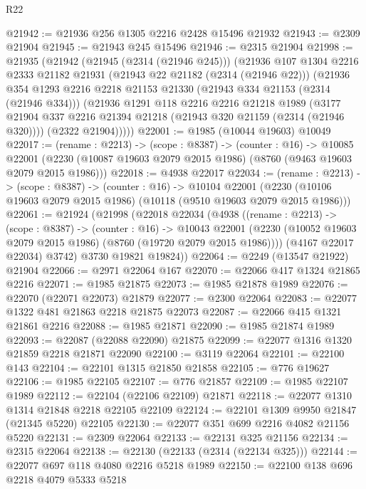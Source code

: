 \begin{lexlean}{R22}
\begin{coremodule}
@21942 := @21936 @256 @1305 @2216 @2428 @15496 @21932
@21943 := @2309 @21904
@21945 := @21943 @245 @15496
@21946 := @2315 @21904
@21998 := @21935
    (@21942
      (@21945 (@2314 (@21946 @245)))
      (@21936
        @107
        @1304
        @2216
        @2333
        @21182
        @21931
        (@21943 @22 @21182 (@2314 (@21946 @22)))
        (@21936
          @354
          @1293
          @2216
          @2218
          @21153
          @21330
          (@21943 @334 @21153 (@2314 (@21946 @334)))
          (@21936
            @1291
            @118
            @2216
            @2216
            @21218
            @1989
            (@3177 @21904 @337 @2216 @21394 @21218 (@21943 @320 @21159 (@2314 (@21946 @320))))
            (@2322 @21904)))))
@22001 := @1985 (@10044 @19603) @10049
@22017 := (rename : @2213) ->
  (scope : @8387) ->
  (counter : @16) ->
  @10085 @22001 (@2230 (@10087 @19603 @2079 @2015 @1986) (@8760 (@9463 @19603 @2079 @2015 @1986)))
@22018 := @4938 @22017
@22034 := (rename : @2213) ->
  (scope : @8387) ->
  (counter : @16) ->
  @10104 @22001 (@2230 (@10106 @19603 @2079 @2015 @1986) (@10118 (@9510 @19603 @2079 @2015 @1986)))
@22061 := @21924
    (@21998
      (@22018
        @22034
        (@4938
          ((rename : @2213) ->
          (scope : @8387) ->
          (counter : @16) ->
          @10043
            @22001
            (@2230 (@10052 @19603 @2079 @2015 @1986) (@8760 (@19720 @2079 @2015 @1986))))
          (@4167 @22017 @22034)
          @3742)
        @3730
        @19821
        @19824))
@22064 := @2249 (@13547 @21922) @21904
@22066 := @2971 @22064 @167
@22070 := @22066 @417 @1324 @21865 @2216
@22071 := @1985 @21875
@22073 := @1985 @21878 @1989
@22076 := @22070 (@22071 @22073) @21879
@22077 := @2300 @22064
@22083 := @22077 @1322 @481 @21863 @2218 @21875 @22073
@22087 := @22066 @415 @1321 @21861 @2216
@22088 := @1985 @21871
@22090 := @1985 @21874 @1989
@22093 := @22087 (@22088 @22090) @21875
@22099 := @22077 @1316 @1320 @21859 @2218 @21871 @22090
@22100 := @3119 @22064
@22101 := @22100 @143
@22104 := @22101 @1315 @21850 @21858
@22105 := @776 @19627
@22106 := @1985 @22105
@22107 := @776 @21857
@22109 := @1985 @22107 @1989
@22112 := @22104 (@22106 @22109) @21871
@22118 := @22077 @1310 @1314 @21848 @2218 @22105 @22109
@22124 := @22101 @1309 @9950 @21847 (@21345 @5220) @22105
@22130 := @22077 @351 @699 @2216 @4082 @21156 @5220
@22131 := @2309 @22064
@22133 := @22131 @325 @21156
@22134 := @2315 @22064
@22138 := @22130 (@22133 (@2314 (@22134 @325)))
@22144 := @22077 @697 @118 @4080 @2216 @5218 @1989
@22150 := @22100 @138 @696 @2218 @4079 @5333 @5218

\end{coremodule}
\end{lexlean}
